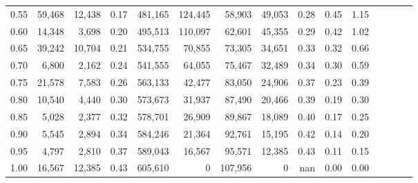 \begin{tabular}{rrrcrrrrrrrrrrr}
0.55 &  59,468 &  12,438 &                                       0.17 &  481,165 &  124,445 &   58,903 &   49,053 &  0.28 &  0.45 &                         1.15 \\
0.60 &  14,348 &   3,698 &                                       0.20 &  495,513 &  110,097 &   62,601 &   45,355 &  0.29 &  0.42 &                         1.02 \\
0.65 &  39,242 &  10,704 &                                       0.21 &  534,755 &   70,855 &   73,305 &   34,651 &  0.33 &  0.32 &                         0.66 \\
0.70 &   6,800 &   2,162 &                                       0.24 &  541,555 &   64,055 &   75,467 &   32,489 &  0.34 &  0.30 &                         0.59 \\
0.75 &  21,578 &   7,583 &                                       0.26 &  563,133 &   42,477 &   83,050 &   24,906 &  0.37 &  0.23 &                         0.39 \\
0.80 &  10,540 &   4,440 &                                       0.30 &  573,673 &   31,937 &   87,490 &   20,466 &  0.39 &  0.19 &                         0.30 \\
0.85 &   5,028 &   2,377 &                                       0.32 &  578,701 &   26,909 &   89,867 &   18,089 &  0.40 &  0.17 &                         0.25 \\
0.90 &   5,545 &   2,894 &                                       0.34 &  584,246 &   21,364 &   92,761 &   15,195 &  0.42 &  0.14 &                         0.20 \\
0.95 &   4,797 &   2,810 &                                       0.37 &  589,043 &   16,567 &   95,571 &   12,385 &  0.43 &  0.11 &                         0.15 \\
1.00 &  16,567 &  12,385 &                                       0.43 &  605,610 &        0 &  107,956 &        0 &   nan &  0.00 &                         0.00 \\
\bottomrule
\end{tabular}
